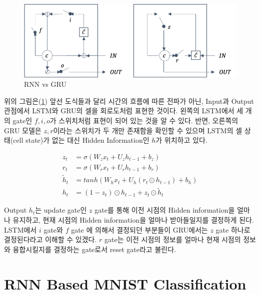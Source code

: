 \documentclass[draft=false]{oblivoir}
\begin{document}
\begin{figure}[ht] \centering 
  \includegraphics[scale=0.7]{fig13.png}
  \caption{RNN vs GRU}
  \label{fig:16-13}
\end{figure}

위의 그림은(\ref{fig:16-13}) 앞선 도식들과 달리 시간의 흐름에 따른 전파가 아닌, Input과 Output 관점에서 LSTM와 GRU의 셀을 회로도처럼 표현한 것이다. 왼쪽의 LSTM에서 세 개의 gate인 $f, i, o$가 스위치처럼 표현이 되어 있는 것을 알 수 있다. 반면, 오른쪽의 GRU 모델은 $z, r$이라는 스위치가 두 개만 존재함을 확인할 수 있으며 LSTM의 셀 상태(cell state)가 없는 대신 Hidden Information인 $h$가 위치하고 있다.

\begin{equation}
	\begin{split}
		z_t & = \sigma(W_z x_t + U_z h_{t-1} + b_z)\\
        r_t & = \sigma(W_r x_t + U_r h_{t-1} + b_r)\\
        \tilde{h}_t & = tanh(W_h x_t + U_h (r_t \odot h_{t-1}) + b_h)\\
        h_t & = (1-z_t) \odot h_{t-1} + z_t \odot \tilde{h}_t
	\end{split}
	\label{eq:16-12}
\end{equation}

Output $h_t$는 update gate인 $z$ gate를 통해 이전 시점의 Hidden information을 얼마나 유지하고, 현재 시점의 Hidden information을 얼마나 받아들일지를 결정하게 된다. LSTM에서 $i$ gate와 $f$ gate 에 의해서 결정되던 부분들이 GRU에서는 $z$ gate 하나로 결정된다라고 이해할 수 있겠다. $r$ gate는 이전 시점의 정보를 얼마나 현재 시점의 정보와 융합시킬지를 결정하는 gate로서 reset gate라고 불린다. 
 
\section{RNN Based MNIST Classification}

\end{document}
